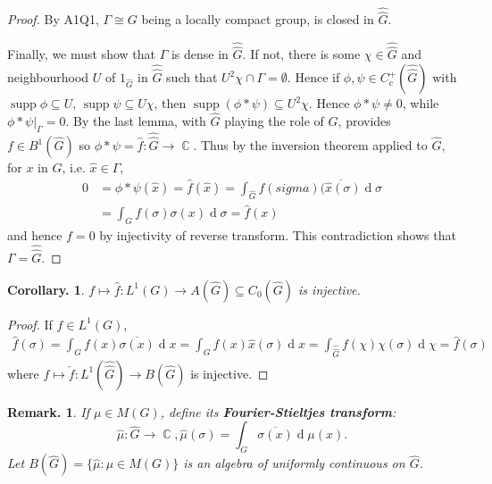 \documentclass[11pt, a4paper]{memoir}
\DeclareMathOperator{\C}{{\mathbb{C}}}
\theoremstyle{change}
\newtheorem{corollary}[theorem]{Corollary.}
\theoremstyle{plain}
\theoremstyle{nonumberplain}
\newtheorem{remark}{Remark.}
\newtheorem{proof}{Proof}
\DeclareMathOperator{\supp}{supp}
\renewcommand{\d}[1]{\ensuremath{\operatorname{d}\!{#1}}}
\newcommand{\defn}[1]{{\boldmath\bfseries #1}}
\numberwithin{equation}{section}
\begin{document}
\begin{proof}
    By A1Q1, $\Gamma\cong G$ being a locally compact group, is closed in $\widehat{\widehat{G}}$.

    Finally, we must show that $\Gamma$ is dense in $\widehat{\widehat{G}}$.
    If not, there is some $\chi\in\widehat{\widehat{G}}$ and neighbourhood $U$ of $1_{\widehat{G}}$ in $\widehat{\widehat{G}}$ such that $U^2\chi\cap\Gamma=\emptyset$.
    Hence if $\phi,\psi\in C_c^+(\widehat{\widehat{G}})$ with $\supp\phi\subseteq U$, $\supp\psi\subseteq U\chi$, then $\supp(\phi*\psi)\subseteq U^2\chi$.
    Hence $\phi*\psi\neq 0$, while $\phi*\psi|_\Gamma=0$.
    By the last lemma, with $\widehat{G}$ playing the role of $G$, provides $f\in B^1(\widehat{G})$ so $\phi*\psi=\hat{f}:\widehat{\widehat{G}}\to\C$.
    Thus by the inversion theorem applied to $\widehat{G}$, for $x$ in $G$, i.e. $\hat{x}\in\Gamma$,
    \begin{align*}
        0&= \phi*\psi(\hat{x}) = \hat{f}(\hat{x})=\int_{\widehat{G}}f(sigma)\overline{(\hat{x}(\sigma)}\d{\sigma}\\
         &=\int_G f(\sigma)\sigma(x)\d{\sigma}=\hat{f}(x)
    \end{align*}
    and hence $f=0$ by injectivity of reverse transform.
    This contradiction shows that $\Gamma=\widehat{\widehat{G}}$.
\end{proof}
\begin{corollary}
    $f\mapsto\hat{f}:L^1(G)\to A(\widehat{G})\subseteq C_0(\widehat{G})$ is injective.
\end{corollary}
\begin{proof}
    If $f\in L^1(G)$,
    \begin{align*}
        \hat{f}(\sigma)=\int_Gf(x)\overline{\sigma(x)}\d{x}=\int_Gf(x)\hat{x}(\sigma)\d{x}=\int_{\widehat{\widehat{G}}}f(\chi)\chi(\sigma)\d{\chi}=\hat{f}(\sigma)
    \end{align*}
    where $f\mapsto\check{f}:L^1(\widehat{\widehat{G}})\to B(\widehat{G})$ is injective.
\end{proof}
\begin{remark}
    If $\mu\in M(G)$, define its \defn{Fourier-Stieltjes transform}:
    \begin{equation*}
        \hat{\mu}:\widehat{G}\to\C,\hat{\mu}(\sigma)=\int_G\overline{\sigma(x)}\d{\mu(x)}.
    \end{equation*}
    Let $B(\hat{G})=\{\hat{\mu}:\mu\in M(G)\}$ is an algebra of uniformly continuous on $\hat{G}$.
\end{remark}
\end{document}
